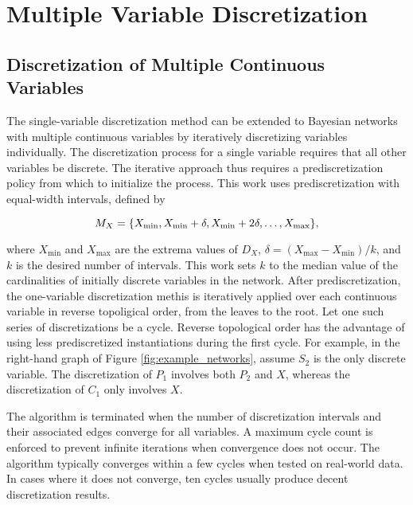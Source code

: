 
\section{Multiple Variable Discretization}
\label{sec:multi_var}

\subsection{Discretization of Multiple Continuous Variables}

The single-variable discretization method can be extended to Bayesian networks with multiple continuous variables by iteratively discretizing variables individually.
The discretization process for a single variable requires that all other variables be discrete.
The iterative approach thus requires a prediscretization policy from which to initialize the process.
This work uses prediscretization with equal-width intervals, defined by

\begin{equation}
M_X = \curly{X_\text{min}, X_\text{min} + \delta, X_\text{min} + 2\delta, \ldots, X_\text{max}}\text{,}
\end{equation}

\noindent
where $X_\text{min}$ and $X_\text{max}$ are the extrema values of $D_X$, $\delta = (X_\text{max} - X_\text{min})/k$, and $k$ is the desired number of intervals.
This work sets $k$ to the median value of the cardinalities of initially discrete variables in the network.
After prediscretization, the one-variable discretization methis is iteratively applied over each continuous variable in reverse topoligical order, from the leaves to the root.
Let one such series of discretizations be a cycle.
Reverse topological order has the advantage of using less prediscretized instantiations during the first cycle.
For example, in the right-hand graph of Figure \ref{fig:example_networks}, assume $S_2$ is the only discrete variable.
The discretization of $P_1$ involves both $P_2$ and $X$, whereas the discretization of $C_1$ only involves $X$.

The algorithm is terminated when the number of discretization intervals and their associated edges converge for all variables.
A maximum cycle count is enforced to prevent infinite iterations when convergence does not occur.
The algorithm typically converges within a few cycles when tested on real-world data.
In cases where it does not converge, ten cycles usually produce decent discretization results.

